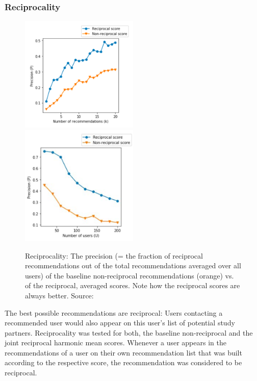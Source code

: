 \documentclass[conference]{IEEEtran}
\begin{document}
\subsubsection{Reciprocality} \label{paper:reciprocality}
\begin{figure}[!t]
	\includegraphics[width=0.5\textwidth]{g/PrecisionByK.PNG}
	\includegraphics[width=0.5\textwidth]{g/PrecisionByU.PNG}
	\caption{Reciprocality: The precision (= the fraction of reciprocal recommendations out of the total recommendations averaged over all users) of the baseline non-reciprocal recommendations (orange) vs. of the reciprocal, averaged scores. Note how the reciprocal scores are always better. Source: \cite{potts2018reciprocal}}
	\label{f:reciprocality}
\end{figure}
The best possible recommendations are reciprocal: Users contacting a recommended user would also appear on this user's list of potential study partners. \cite{prabhakar2017reciprocal} Reciprocality was tested for both, the baseline non-reciprocal and the joint reciprocal harmonic mean scores. Whenever a user appears in the recommendations of a user on their own recommendation list that was built according to the respective score, the recommendation was considered to be reciprocal.\\
\end{document}
